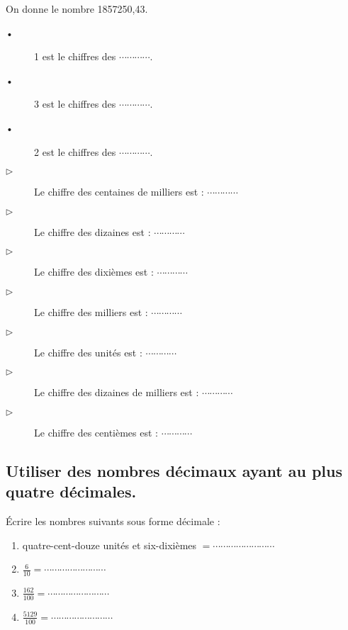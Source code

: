
On donne le  nombre 1857250,43. 
\begin{description}
\item[•] 1 est le chiffres des $ \cdots\cdots\cdots\cdots $.
\item[•] 3 est le chiffres des $ \cdots\cdots\cdots\cdots $.
\item[•] 2 est le chiffres des $ \cdots\cdots\cdots\cdots $.

\item[$\triangleright$] Le chiffre des centaines de milliers est : $ \cdots\cdots\cdots\cdots $
\item[$\triangleright$] Le chiffre des dizaines est : $ \cdots\cdots\cdots\cdots $
\item[$\triangleright$] Le chiffre des dixièmes est : $ \cdots\cdots\cdots\cdots $
\item[$\triangleright$] Le chiffre des milliers est :  $ \cdots\cdots\cdots\cdots $
\item[$\triangleright$] Le chiffre des unités est : $ \cdots\cdots\cdots\cdots $
\item[$\triangleright$] Le chiffre des dizaines de milliers est : $ \cdots\cdots\cdots\cdots $
\item[$\triangleright$] Le chiffre des centièmes est : $ \cdots\cdots\cdots\cdots $

\end{description}







\subsection{Utiliser des nombres décimaux ayant au plus quatre décimales.}




Écrire les nombres suivants sous forme décimale :
\begin{enumerate}
\item quatre-cent-douze unités et six-dixièmes $= \cdots\cdots\cdots\cdots\cdots\cdots\cdots\cdots $
\item $\frac{6}{10}= \cdots\cdots\cdots\cdots\cdots\cdots\cdots\cdots$
\item $\frac{162}{100}= \cdots\cdots\cdots\cdots\cdots\cdots\cdots\cdots$
\item $\frac{5129}{100}= \cdots\cdots\cdots\cdots\cdots\cdots\cdots\cdots$
\end{enumerate}
 

